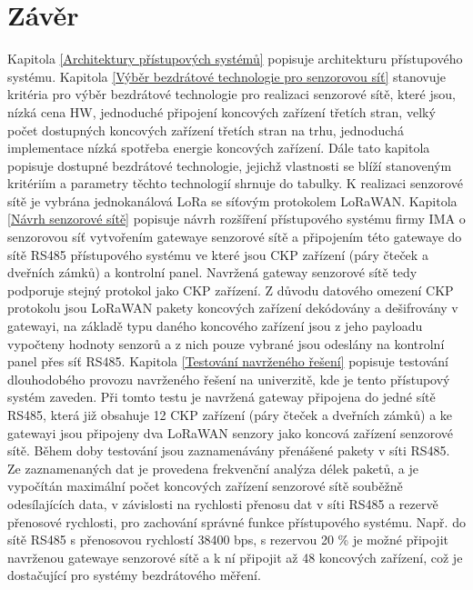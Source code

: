 \chapter{Závěr}
%
\DIFaddbegin {}\DIFaddend Kapitola \ref{Architektury přístupových systémů} popisuje architekturu přístupového systému.
%
Kapitola \ref{Výběr bezdrátové technologie pro senzorovou síť} stanovuje kritéria pro výběr bezdrátové technologie pro realizaci senzorové sítě, které jsou, nízká cena HW, jednoduché připojení  koncových zařízení třetích stran, velký počet dostupných koncových zařízení třetích stran na trhu, jednoduchá implementace \DIFdelbegin \DIFdel{, }\DIFdelend \DIFaddbegin {}\DIFaddend nízká spotřeba energie koncových zařízení.
Dále tato kapitola popisuje dostupné bezdrátové technologie, jejichž vlastnosti se blíží stanoveným kritériím a parametry těchto technologií shrnuje do tabulky. 
K realizaci senzorové sítě je vybrána jednokanálová LoRa se síťovým protokolem LoRaWAN\DIFdelbegin {}\DIFdelend .
%
Kapitola \ref{Návrh senzorové sítě} popisuje návrh rozšíření přístupového systému firmy IMA o senzorovou síť vytvořením gatewaye senzorové sítě a připojením této gatewaye do sítě RS485 přístupového systému ve které jsou CKP zařízení (páry čteček a dveřních zámků) a kontrolní panel. Navržená gateway senzorové sítě tedy podporuje stejný protokol jako CKP zařízení.
Z důvodu datového omezení CKP protokolu jsou LoRaWAN pakety koncových zařízení dekódovány a dešifrovány v gatewayi, na základě typu daného koncového zařízení jsou z jeho payloadu vypočteny hodnoty senzorů a z nich pouze vybrané jsou odeslány na kontrolní panel přes síť RS485.
%
Kapitola \ref{Testování navrženého řešení} popisuje testování dlouhodobého provozu navrženého řešení na univerzitě, kde je tento přístupový systém zaveden. 
Při tomto testu je navržená gateway připojena do jedné sítě RS485, která již obsahuje 12 CKP zařízení (páry čteček a dveřních zámků) a ke gatewayi jsou připojeny dva LoRaWAN senzory jako koncová zařízení senzorové sítě.
Během doby testování jsou zaznamenávány přenášené pakety v síti RS485.
Ze zaznamenaných dat je provedena frekvenční analýza délek paketů, a je vypočítán maximální počet koncových zařízení senzorové sítě souběžně odesílajících data, v závislosti na rychlosti přenosu dat v síti RS485 a rezervě přenosové rychlosti, pro zachování správné funkce přístupového systému.
Např. do sítě RS485 s přenosovou rychlostí 38400 bps, s rezervou 20 \% je možné připojit navrženou gatewaye senzorové sítě a k ní připojit až 48 koncových zařízení, což je dostačující pro systémy bezdrátového měření.

